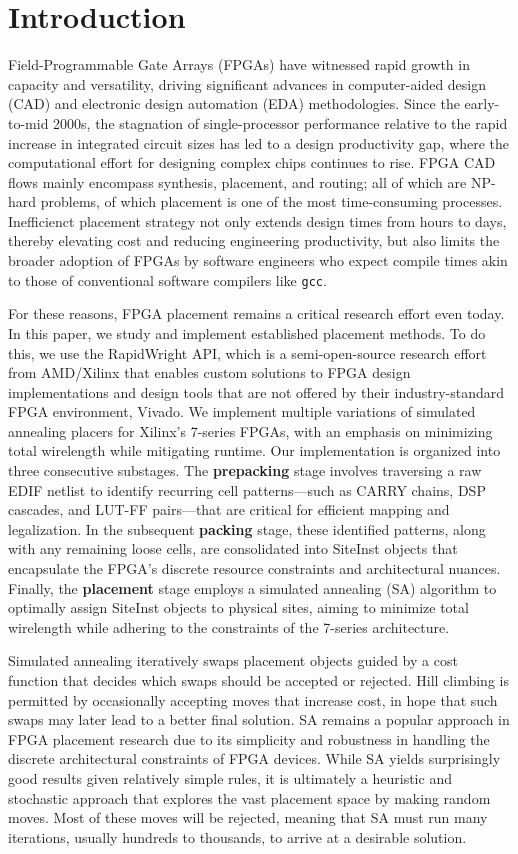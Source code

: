 \section{Introduction}

Field-Programmable Gate Arrays (FPGAs) have witnessed rapid growth in capacity and versatility, driving significant advances in computer-aided design (CAD) and electronic design automation (EDA) methodologies. 
Since the early-to-mid 2000s, the stagnation of single-processor performance relative to the rapid increase in integrated circuit sizes has led to a design productivity gap, where the computational effort for designing complex chips continues to rise. 
FPGA CAD flows mainly encompass synthesis, placement, and routing; all of which are NP-hard problems, of which placement is one of the most time-consuming processes. 
Inefficienct placement strategy not only extends design times from hours to days, thereby elevating cost and reducing engineering productivity, but also limits the broader adoption of FPGAs by software engineers who expect compile times akin to those of conventional software compilers like {\tt gcc}. 

For these reasons, FPGA placement remains a critical research effort even today. 
In this paper, we study and implement established placement methods. 
To do this, we use the RapidWright API, which is a semi-open-source research effort from AMD/Xilinx that enables custom solutions to FPGA design implementations and design tools that are not offered by their industry-standard FPGA environment, Vivado. 
We implement multiple variations of simulated annealing placers for Xilinx's 7-series FPGAs, with an emphasis on minimizing total wirelength while mitigating runtime. 
Our implementation is organized into three consecutive substages. 
The \textbf{prepacking} stage involves traversing a raw EDIF netlist to identify recurring cell patterns—such as CARRY chains, DSP cascades, and LUT-FF pairs—that are critical for efficient mapping and legalization. 
In the subsequent \textbf{packing} stage, these identified patterns, along with any remaining loose cells, are consolidated into SiteInst objects that encapsulate the FPGA’s discrete resource constraints and architectural nuances. 
Finally, the \textbf{placement} stage employs a simulated annealing (SA) algorithm to optimally assign SiteInst objects to physical sites, aiming to minimize total wirelength while adhering to the constraints of the 7-series architecture. 

Simulated annealing iteratively swaps placement objects guided by a cost function that decides which swaps should be accepted or rejected. 
Hill climbing is permitted by occasionally accepting moves that increase cost, in hope that such swaps may later lead to a better final solution. 
SA remains a popular approach in FPGA placement research due to its simplicity and robustness in handling the discrete architectural constraints of FPGA devices. 
While SA yields surprisingly good results given relatively simple rules, it is ultimately a heuristic and stochastic approach that explores the vast placement space by making random moves. 
Most of these moves will be rejected, meaning that SA must run many iterations, usually hundreds to thousands, to arrive at a desirable solution. 

